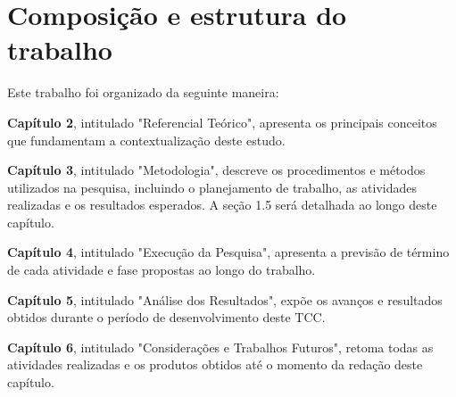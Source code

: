 \section{Composição e estrutura do trabalho}
Este trabalho foi organizado da seguinte maneira:

\textbf{Capítulo 2}, intitulado "Referencial Teórico", apresenta os principais conceitos que fundamentam a contextualização deste estudo.

\textbf{Capítulo 3}, intitulado "Metodologia", descreve os procedimentos e métodos utilizados na pesquisa, incluindo o planejamento de trabalho, as atividades realizadas e os resultados esperados. A seção 1.5 será detalhada ao longo deste capítulo.

\textbf{Capítulo 4}, intitulado "Execução da Pesquisa", apresenta a previsão de término de cada atividade e fase propostas ao longo do trabalho.

\textbf{Capítulo 5}, intitulado "Análise dos Resultados", expõe os avanços e resultados obtidos durante o período de desenvolvimento deste TCC.

\textbf{Capítulo 6}, intitulado "Considerações e Trabalhos Futuros", retoma todas as atividades realizadas e os produtos obtidos até o momento da redação deste capítulo.